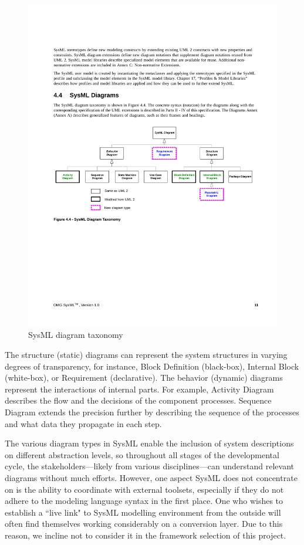 \begin{figure}[hbt!]
  \centering
  \includegraphics[scale=0.75]{figures/sysml_tax.pdf}
  \caption[SysML diagram taxonomy]{SysML diagram taxonomy \cite{sysmlspec}}
  \label{fig:sysmltax}
\end{figure}

The structure (static) diagrams can represent the system structures in varying degrees of transparency, for instance, Block Definition (black-box), Internal Block (white-box), or Requirement (declarative). The behavior (dynamic) diagrams represent the interactions of internal parts. For example, Activity Diagram describes the flow and the decisions of the component processes. Sequence Diagram extends the precision further by describing the sequence of the processes and what data they propagate in each step. 

The various diagram types in SysML enable the inclusion of system descriptions on different abstraction levels, so throughout all stages of the developmental cycle, the stakeholders---likely from various disciplines---can understand relevant diagrams without much efforts. However, one aspect SysML does not concentrate on is the ability to coordinate with external toolsets, especially if they do not adhere to the modeling language syntax in the first place. One who wishes to establish a ``live link" to SysML modelling environment from the outside will often find themselves working considerably on a conversion layer. Due to this reason, we incline not to consider it in the framework selection of this project.

